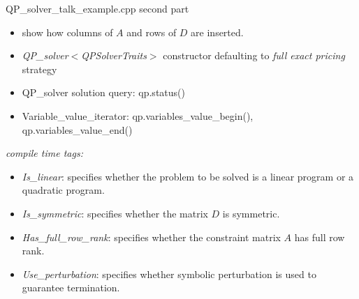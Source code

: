 \documentclass{slides}
\begin{document}
\begin{slide}
QP\_solver\_talk\_example.cpp second part
\end{slide}

\begin{note}
\begin{itemize}
\item show how columns of $A$ and rows of $D$ are inserted.
\item \emph{QP\_solver$<$QPSolverTraits$>$} constructor defaulting to
\emph{full exact pricing} strategy
\item QP\_solver solution query: qp.status()
\item Variable\_value\_iterator: qp.variables\_value\_begin(),
qp.variables\_value\_end()
\end{itemize}
\end{note}

%



\begin{slide}
\emph{compile time tags:}
\begin{itemize}
\item \emph{Is\_linear}: specifies whether the problem to be solved is a linear
program or a quadratic program.
\item \emph{Is\_symmetric}: specifies whether the matrix $D$ is symmetric.  
\item \emph{Has\_full\_row\_rank}: specifies whether the constraint matrix $A$
has full row rank.
\item \emph{Use\_perturbation}: specifies whether symbolic perturbation is 
used to guarantee termination.
\end{itemize}
\end{slide}
\end{document}
